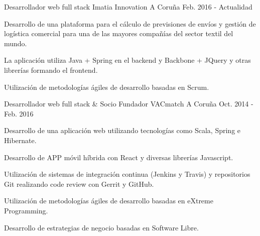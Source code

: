 


\begin{cventries}


\cventry
{Desarrollador web full stack} %
{Imatia Innovation} %
{A Coruña} %
{Feb. 2016 - Actualidad} %
{ %
\begin{cvitems}
\item {Desarrollo de una plataforma para el cálculo de previsiones de envíos y 
gestión de logística comercial para una de las mayores compañías del sector 
textil del mundo.}
\item {La aplicación utiliza Java + Spring en el backend y 
Backbone + JQuery y otras librerías formando el frontend.}
\item {Utilización de metodologías ágiles de desarrollo basadas en 
Scrum.}
\end{cvitems}
}

\cventry
{Desarrollador web full stack \& Socio Fundador} %
{VACmatch} %
{A Coruña} %
{Oct. 2014 - Feb. 2016} %
{ %
\begin{cvitems}
\item {Desarrollo de una aplicación web utilizando tecnologías como Scala, 
Spring e Hibernate.}
\item {Desarrollo de APP móvil híbrida con React y diversas librerías 
Javascript.}
\item {Utilización de sistemas de integración continua (Jenkins y Travis) y 
repositorios Git realizando code review con Gerrit y GitHub.}
\item {Utilización de metodologías ágiles de desarrollo basadas en eXtreme 
Programming.}
\item {Desarrollo de estrategias de negocio basadas en Software Libre.}
\end{cvitems}
}



\end{cventries}